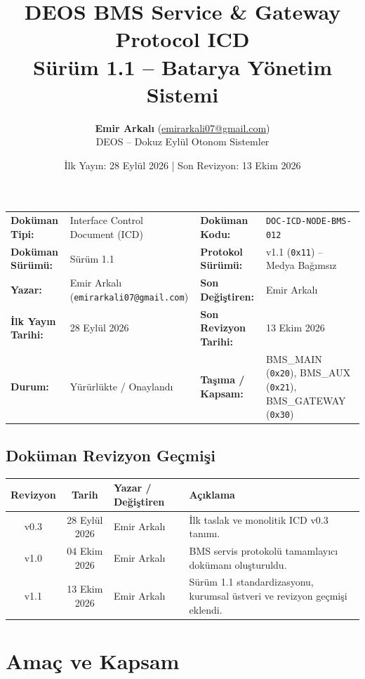 \documentclass[a4paper,10pt]{article}
\title{\textbf{DEOS BMS Service \& Gateway Protocol ICD}\\
\large Sürüm 1.1 -- Batarya Yönetim Sistemi}
\author{\textbf{Emir Arkalı} (\href{mailto:emirarkali07@gmail.com}{emirarkali07@gmail.com})\\DEOS -- Dokuz Eylül Otonom Sistemler}
\date{İlk Yayın: 28 Eylül 2026 \quad | \quad Son Revizyon: 13 Ekim 2026}
\newcommand{\hex}[1]{\texttt{0x#1}}
\newcommand{\code}[1]{\texttt{#1}}
\begin{document}
\maketitle

\begin{center}
\small
\begin{tabularx}{\textwidth}{ll lX}
\toprule
\textbf{Doküman Tipi:} & Interface Control Document (ICD) & \textbf{Doküman Kodu:} & \code{DOC-ICD-NODE-BMS-012} \\
\textbf{Doküman Sürümü:} & Sürüm 1.1 & \textbf{Protokol Sürümü:} & v1.1 (\hex{11}) -- Medya Bağımsız \\
\textbf{Yazar:} & Emir Arkalı (\texttt{emirarkali07@gmail.com}) & \textbf{Son Değiştiren:} & Emir Arkalı \\
\textbf{İlk Yayın Tarihi:} & 28 Eylül 2026 & \textbf{Son Revizyon Tarihi:} & 13 Ekim 2026 \\
\textbf{Durum:} & Yürürlükte / Onaylandı & \textbf{Taşıma / Kapsam:} & BMS\_MAIN (\hex{20}), BMS\_AUX (\hex{21}), BMS\_GATEWAY (\hex{30}) \\
\bottomrule
\end{tabularx}
\end{center}

\subsection*{Doküman Revizyon Geçmişi}
\begin{center}
\small
\begin{tabularx}{\textwidth}{c c l X}
\toprule
\textbf{Revizyon} & \textbf{Tarih} & \textbf{Yazar / Değiştiren} & \textbf{Açıklama} \\
\midrule
v0.3 & 28 Eylül 2026 & Emir Arkalı & İlk taslak ve monolitik ICD v0.3 tanımı. \\
v1.0 & 04 Ekim 2026 & Emir Arkalı & BMS servis protokolü tamamlayıcı dokümanı oluşturuldu. \\
v1.1 & 13 Ekim 2026 & Emir Arkalı & Sürüm 1.1 standardizasyonu, kurumsal üstveri ve revizyon geçmişi eklendi. \\
\bottomrule
\end{tabularx}
\end{center}
\vspace{0.8em}

\section{Amaç ve Kapsam}
\end{document}

